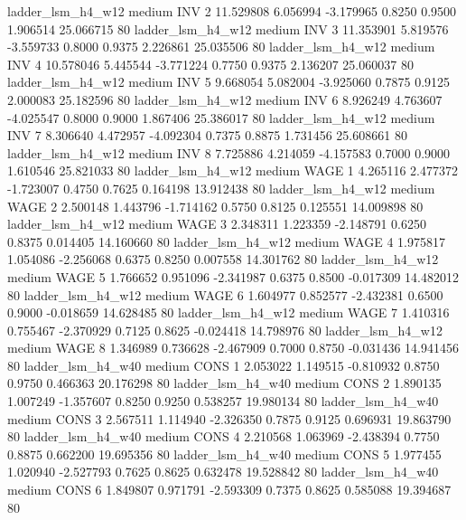      ladder_lsm_h4_w12     medium      INV                 2 11.529808 6.056994 -3.179965 0.8250 0.9500  1.906514   25.066715 80
     ladder_lsm_h4_w12     medium      INV                 3 11.353901 5.819576 -3.559733 0.8000 0.9375  2.226861   25.035506 80
     ladder_lsm_h4_w12     medium      INV                 4 10.578046 5.445544 -3.771224 0.7750 0.9375  2.136207   25.060037 80
     ladder_lsm_h4_w12     medium      INV                 5  9.668054 5.082004 -3.925060 0.7875 0.9125  2.000083   25.182596 80
     ladder_lsm_h4_w12     medium      INV                 6  8.926249 4.763607 -4.025547 0.8000 0.9000  1.867406   25.386017 80
     ladder_lsm_h4_w12     medium      INV                 7  8.306640 4.472957 -4.092304 0.7375 0.8875  1.731456   25.608661 80
     ladder_lsm_h4_w12     medium      INV                 8  7.725886 4.214059 -4.157583 0.7000 0.9000  1.610546   25.821033 80
     ladder_lsm_h4_w12     medium     WAGE                 1  4.265116 2.477372 -1.723007 0.4750 0.7625  0.164198   13.912438 80
     ladder_lsm_h4_w12     medium     WAGE                 2  2.500148 1.443796 -1.714162 0.5750 0.8125  0.125551   14.009898 80
     ladder_lsm_h4_w12     medium     WAGE                 3  2.348311 1.223359 -2.148791 0.6250 0.8375  0.014405   14.160660 80
     ladder_lsm_h4_w12     medium     WAGE                 4  1.975817 1.054086 -2.256068 0.6375 0.8250  0.007558   14.301762 80
     ladder_lsm_h4_w12     medium     WAGE                 5  1.766652 0.951096 -2.341987 0.6375 0.8500 -0.017309   14.482012 80
     ladder_lsm_h4_w12     medium     WAGE                 6  1.604977 0.852577 -2.432381 0.6500 0.9000 -0.018659   14.628485 80
     ladder_lsm_h4_w12     medium     WAGE                 7  1.410316 0.755467 -2.370929 0.7125 0.8625 -0.024418   14.798976 80
     ladder_lsm_h4_w12     medium     WAGE                 8  1.346989 0.736628 -2.467909 0.7000 0.8750 -0.031436   14.941456 80
     ladder_lsm_h4_w40     medium     CONS                 1  2.053022 1.149515 -0.810932 0.8750 0.9750  0.466363   20.176298 80
     ladder_lsm_h4_w40     medium     CONS                 2  1.890135 1.007249 -1.357607 0.8250 0.9250  0.538257   19.980134 80
     ladder_lsm_h4_w40     medium     CONS                 3  2.567511 1.114940 -2.326350 0.7875 0.9125  0.696931   19.863790 80
     ladder_lsm_h4_w40     medium     CONS                 4  2.210568 1.063969 -2.438394 0.7750 0.8875  0.662200   19.695356 80
     ladder_lsm_h4_w40     medium     CONS                 5  1.977455 1.020940 -2.527793 0.7625 0.8625  0.632478   19.528842 80
     ladder_lsm_h4_w40     medium     CONS                 6  1.849807 0.971791 -2.593309 0.7375 0.8625  0.585088   19.394687 80
